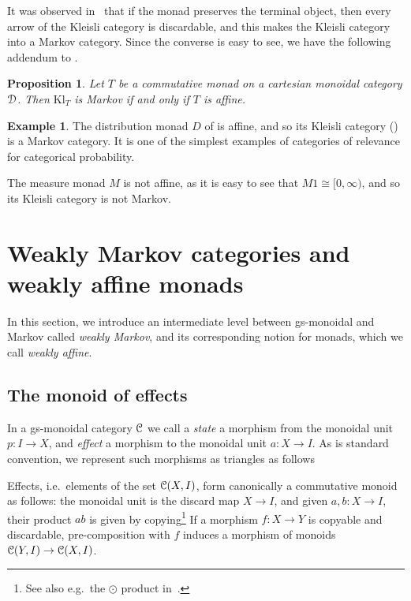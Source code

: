 \documentclass[a4paper,UKenglish,numberwithinsect,cleveref, autoref, thm-restate]{lipics-v2021}
\theoremstyle{plain} %
\newtheorem{myproposition}[mytheorem]{Proposition}
\theoremstyle{definition} %
\newtheorem{myexample}[mytheorem]{Example}
\begin{document}
It was observed in~\cite[Corollary~3.2]{Fritz_2020} that if the monad preserves the terminal object, then every arrow of the Kleisli category is discardable, and this makes the Kleisli category into a Markov category.
Since the converse is easy to see, we have the following addendum to .

\begin{myproposition}\label{affinemarkov}
Let $T$ be a commutative monad on a cartesian monoidal category $\mathcal{D}$. Then $\mathrm{Kl}_T$ is Markov if and only if $T$ is affine.
\end{myproposition}
 
 
\begin{myexample}
 The distribution monad $D$ of  is affine, and so its Kleisli category () is a Markov category. It is one of the simplest examples of categories of relevance for categorical probability.
 
 The measure monad $M$ is not affine, as it is easy to see that $M1\cong[0,\infty)$, and so its Kleisli category is not Markov.
\end{myexample}


\section{Weakly Markov categories and weakly affine monads}
\label{secweakly}

In this section, we introduce an intermediate level between gs-monoidal and Markov called \emph{weakly Markov}, and its corresponding notion for monads, which we call \emph{weakly affine}.

\subsection{The monoid of effects}\label{monoids}

In a gs-monoidal category $\mathcal{C}$ we call a \emph{state} a morphism from the monoidal unit $p:I\to X$, and \emph{effect} a morphism to the monoidal unit $a:X\to I$.
As is standard convention, we represent such morphisms as triangles as follows

 Effects, i.e.~elements of the set $\mathcal{C}(X,I)$, form canonically a commutative monoid as follows: the monoidal unit is the discard map $X\to I$, and given $a,b:X\to I$, their product $ab$ is given by copying\footnote{See also e.g.~the $\odot$ product in~\cite[Proposition~3.10]{coecke2011phasegroups}.}
If a morphism $f:X\to Y$ is copyable and discardable, pre-composition with $f$ induces a morphism of monoids $\mathcal{C}(Y,I)\to\mathcal{C}(X,I)$. 
\end{document}
